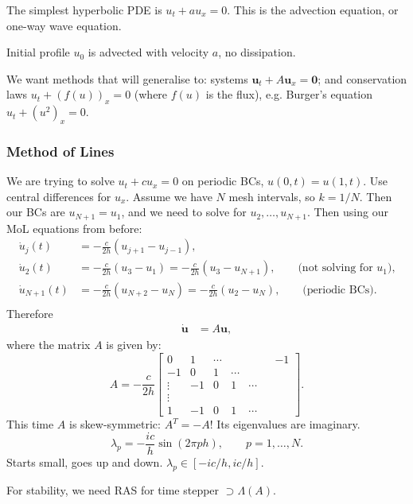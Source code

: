 \documentclass[12pt, a4paper]{article}
\renewcommand{\vec}[1]{\mathbf{#1}}
\theoremstyle{definition}
\theoremstyle{remark}
\numberwithin{equation}{section}
\begin{document}
The simplest hyperbolic PDE is $u_t + au_x = 0$. This is the advection equation,
or one-way wave equation.

Initial profile $u_0$ is advected with velocity $a$, no dissipation.

\vspace{5 cm}



We want methods that will generalise to: systems $\vec{u}_t + A\vec{u}_x = \vec{0}$;
and conservation laws $u_t + (f(u))_x = 0$ (where $f(u)$ is the flux), e.g. Burger's
equation $u_t + (u^2)_x = 0$.

\newpage
\subsubsection{Method of Lines}

We are trying to solve $u_t + c u_x = 0$ on periodic BCs, $u(0,t) = u(1,t)$.
Use central differences for $u_x$. Assume we have $N$ mesh intervals, 
so $k = 1/N$. 
Then our BCs are $u_{N+1} = u_1$, and we need to solve for
$u_2, \ldots, u_{N+1}$. 
Then using our MoL equations from before:
\begin{align*}
\dot{u}_j(t) &= -\tfrac{c}{2h}(u_{j+1} - u_{j-1}), \\
\dot{u}_2(t) &= -\tfrac{c}{2h}(u_3 - u_1) = -\tfrac{c}{2h}(u_3 - u_{N+1}), \qquad \text{(not solving for $u_1$),} \\
\dot{u}_{N+1}(t) &= -\tfrac{c}{2h}(u_{N+2} - u_N) = -\tfrac{c}{2h}(u_2 - u_N), \qquad \text{(periodic BCs).} \\
\end{align*}
Therefore
\begin{align*}
\mathbf{\dot u} &= A \mathbf{u},
\end{align*}
where the matrix $A$ is given by:
$$ A = -\frac{c}{2h} \left[ \begin{array}{ccccccc}
0 & 1 & \cdots & & & & -1 \\
-1 & 0 & 1 & \cdots \\
\vdots & -1 & 0 & 1 & \cdots \\
\vdots \\
1 & -1 & 0 & 1 & \cdots 
\end{array} \right]. $$
This time $A$ is skew-symmetric: $A^T = -A$! Its eigenvalues are imaginary.
$$ \lambda_p = -\frac{ic}{h} \sin(2\pi ph), \qquad p=1,\ldots,N. $$
Starts small, goes up and down. $\lambda_p \in [-ic/h, ic/h]$.

For stability, we need RAS for time stepper $\supset \Lambda(A)$.
\end{document}
